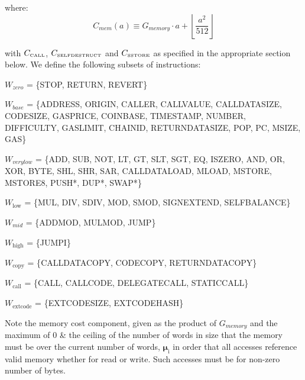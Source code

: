 \documentclass[9pt,oneside]{amsart}
\begin{document}
where:
\begin{equation}
C_{mem}(a) \equiv G_{memory} \cdot a + \left\lfloor \dfrac{a^2}{512} \right\rfloor
\end{equation}

with $C_\text{\tiny CALL}$, $C_\text{\tiny SELFDESTRUCT}$ and $C_\text{\tiny SSTORE}$ as specified in the appropriate section below. We define the following subsets of instructions:

$W_{zero}$ = \{{\small STOP}, {\small RETURN}, {\small REVERT}\}

$W_{base}$ = \{{\small ADDRESS}, {\small ORIGIN}, {\small CALLER}, {\small CALLVALUE}, {\small CALLDATASIZE}, {\small CODESIZE}, {\small GASPRICE}, {\small COINBASE},\newline \noindent\hspace*{1cm} {\small TIMESTAMP}, {\small NUMBER}, {\small DIFFICULTY}, {\small GASLIMIT}, {\small CHAINID}, {\small RETURNDATASIZE}, {\small POP}, {\small PC}, {\small MSIZE}, {\small GAS}\}

$W_{verylow}$ = \{{\small ADD}, {\small SUB}, {\small NOT}, {\small LT}, {\small GT}, {\small SLT}, {\small SGT}, {\small EQ}, {\small ISZERO}, {\small AND}, {\small OR}, {\small XOR}, {\small BYTE}, {\small SHL}, {\small SHR}, {\small SAR}, \newline \noindent\hspace*{1cm} {\small CALLDATALOAD}, {\small MLOAD}, {\small MSTORE}, {\small MSTORE8}, {\small PUSH*}, {\small DUP*}, {\small SWAP*}\}

$W_{\mathrm{low}}$ = \{{\small MUL}, {\small DIV}, {\small SDIV}, {\small MOD}, {\small SMOD}, {\small SIGNEXTEND}, {\small SELFBALANCE}\}

$W_{mid}$ = \{{\small ADDMOD}, {\small MULMOD}, {\small JUMP}\}

$W_{\mathrm{high}}$ = \{{\small JUMPI}\}

$W_{\mathrm{copy}}$ = \{{\small CALLDATACOPY}, {\small CODECOPY}, {\small RETURNDATACOPY}\}

$W_{\mathrm{call}}$ = \{{\small CALL}, {\small CALLCODE}, {\small DELEGATECALL}, {\small STATICCALL}\}

$W_{\mathrm{extcode}}$ = \{{\small EXTCODESIZE}, {\small EXTCODEHASH}\}

Note the memory cost component, given as the product of $G_{memory}$ and the maximum of 0 \& the ceiling of the number of words in size that the memory must be over the current number of words, $\boldsymbol{\mu}_{\mathrm{i}}$ in order that all accesses reference valid memory whether for read or write. Such accesses must be for non-zero number of bytes.
\end{document}
